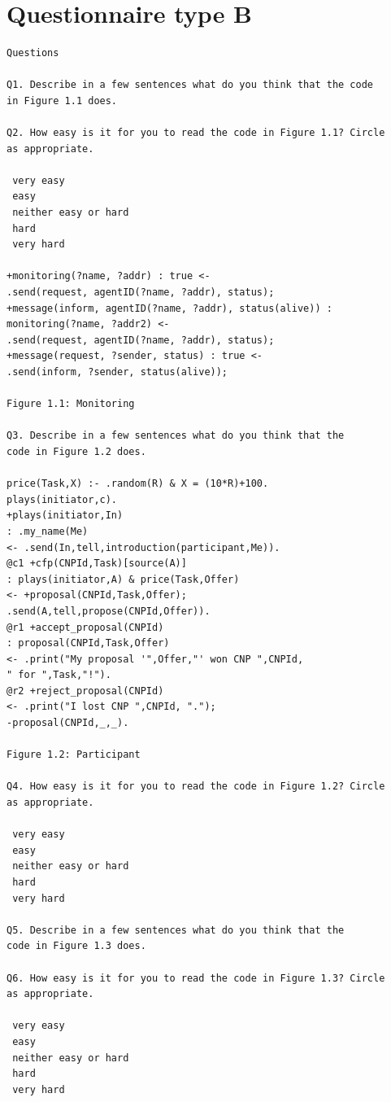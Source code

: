 \documentclass[a4paper,12pt,oneside,fleqn]{book} %
\begin{document}

\chapter{Questionnaire type B}\label{app:SurveyB} %
\begin{verbatim}
Questions

Q1. Describe in a few sentences what do you think that the code
in Figure 1.1 does.

Q2. How easy is it for you to read the code in Figure 1.1? Circle
as appropriate.

 very easy
 easy
 neither easy or hard
 hard
 very hard

+monitoring(?name, ?addr) : true <-
.send(request, agentID(?name, ?addr), status);
+message(inform, agentID(?name, ?addr), status(alive)) :
monitoring(?name, ?addr2) <-
.send(request, agentID(?name, ?addr), status);
+message(request, ?sender, status) : true <-
.send(inform, ?sender, status(alive));

Figure 1.1: Monitoring

Q3. Describe in a few sentences what do you think that the
code in Figure 1.2 does.

price(Task,X) :- .random(R) & X = (10*R)+100.
plays(initiator,c).
+plays(initiator,In)
: .my_name(Me)
<- .send(In,tell,introduction(participant,Me)).
@c1 +cfp(CNPId,Task)[source(A)]
: plays(initiator,A) & price(Task,Offer)
<- +proposal(CNPId,Task,Offer);
.send(A,tell,propose(CNPId,Offer)).
@r1 +accept_proposal(CNPId)
: proposal(CNPId,Task,Offer)
<- .print("My proposal '",Offer,"' won CNP ",CNPId,
" for ",Task,"!").
@r2 +reject_proposal(CNPId)
<- .print("I lost CNP ",CNPId, ".");
-proposal(CNPId,_,_).

Figure 1.2: Participant

Q4. How easy is it for you to read the code in Figure 1.2? Circle
as appropriate.

 very easy
 easy
 neither easy or hard
 hard
 very hard

Q5. Describe in a few sentences what do you think that the
code in Figure 1.3 does.

Q6. How easy is it for you to read the code in Figure 1.3? Circle
as appropriate.

 very easy
 easy
 neither easy or hard
 hard
 very hard


\end{verbatim}
\end{document}
